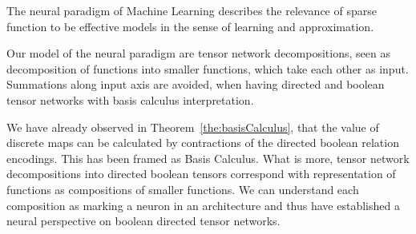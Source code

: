 
The neural paradigm of Machine Learning describes the relevance of sparse function to be effective models in the sense of learning and approximation.

Our model of the neural paradigm are tensor network decompositions, seen as decomposition of functions into smaller functions, which take each other as input.
Summations along input axis are avoided, when having directed and boolean tensor networks with basis calculus interpretation.

We have already observed in Theorem~\ref{the:basisCalculus}, that the value of discrete maps can be calculated by contractions of the directed boolean relation encodings.
This has been framed as Basis Calculus.
What is more, tensor network decompositions into directed boolean tensors correspond with representation of functions as compositions of smaller functions.
We can understand each composition as marking a neuron in an architecture and thus have established a neural perspective on boolean directed tensor networks.
